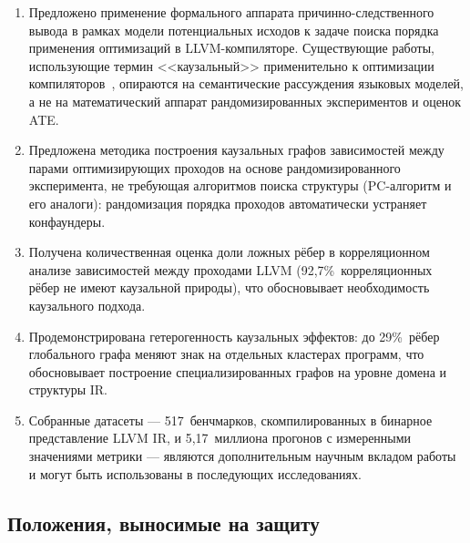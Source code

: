 \begin{enumerate}
    \item Предложено применение формального аппарата причинно-следственного вывода в рамках модели потенциальных исходов к задаче поиска порядка применения оптимизаций в LLVM-компиляторе. Существующие работы, использующие термин <<каузальный>> применительно к оптимизации компиляторов~\cite{pan2026ecco}, опираются на семантические рассуждения языковых моделей, а не на математический аппарат рандомизированных экспериментов и оценок ATE.
    \item Предложена методика построения каузальных графов зависимостей между парами оптимизирующих проходов на основе рандомизированного эксперимента, не требующая алгоритмов поиска структуры (PC-алгоритм и его аналоги): рандомизация порядка проходов автоматически устраняет конфаундеры.
    \item Получена количественная оценка доли ложных рёбер в корреляционном анализе зависимостей между проходами LLVM (92{,}7\%~корреляционных рёбер не имеют каузальной природы), что обосновывает необходимость каузального подхода.
    \item Продемонстрирована гетерогенность каузальных эффектов: до 29\%~рёбер глобального графа меняют знак на отдельных кластерах программ, что обосновывает построение специализированных графов на уровне домена и структуры IR.
    \item Собранные датасеты --- 517~бенчмарков, скомпилированных в бинарное представление LLVM IR, и 5,17~миллиона прогонов с измеренными значениями метрики --- являются дополнительным научным вкладом работы и могут быть использованы в последующих исследованиях.
\end{enumerate}

\subsection{Положения, выносимые на защиту}

